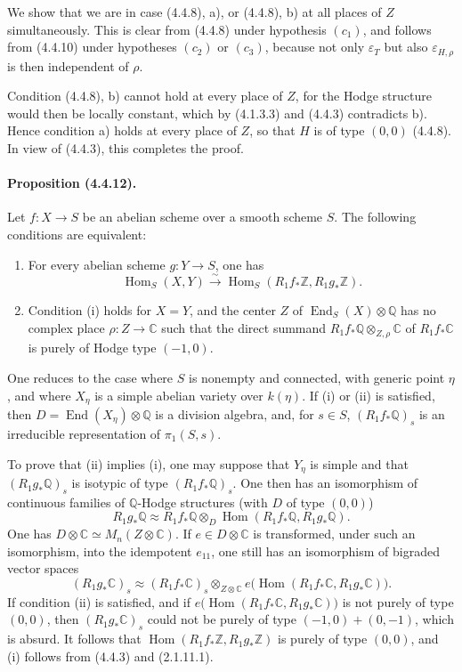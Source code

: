 \documentclass[10pt]{article}
\newcommand{\C}{\mathbb C}
\newcommand{\Q}{\mathbb Q}
\newcommand{\Z}{\mathbb Z}
\newcommand{\Hom}{\operatorname{Hom}}
\newcommand{\iso}{\xrightarrow{\sim}}
\providecommand{\End}{\operatorname{End}}
\begin{document}
We show that we are in case (4.4.8), a), or (4.4.8), b) at all places of $Z$ simultaneously. This is clear from (4.4.8) under hypothesis $(c_1)$, and follows from (4.4.10) under hypotheses $(c_2)$ or $(c_3)$, because not only $\varepsilon_T$ but also $\varepsilon_{H,\rho}$ is then independent of $\rho$.

Condition (4.4.8), b) cannot hold at every place of $Z$, for the Hodge structure would then be locally constant, which by (4.1.3.3) and (4.4.3) contradicts b). Hence condition a) holds at every place of $Z$, so that $H$ is of type $(0,0)$ (4.4.8). In view of (4.4.3), this completes the proof.

\paragraph{Proposition (4.4.12).} Let $f:X\to S$ be an abelian scheme over a smooth scheme $S$. The following conditions are equivalent:
\begin{enumerate}[label=(\roman*)]
\item For every abelian scheme $g:Y\to S$, one has
\[
\Hom_S(X,Y)\iso \Hom_S(R_1f_*\Z,R_1g_*\Z).
\]
\item Condition (i) holds for $X=Y$, and the center $Z$ of $\End_S(X)\otimes\Q$ has no complex place $\rho:Z\to\C$ such that the direct summand $R_1f_*\Q\otimes_{Z,\rho}\C$ of $R_1f_*\C$ is purely of Hodge type $(-1,0)$.
\end{enumerate}




One reduces to the case where $S$ is nonempty and connected, with generic point $\eta$, and where $X_\eta$ is a simple abelian variety over $k(\eta)$. If (i) or (ii) is satisfied, then $D=\End(X_\eta)\otimes\Q$ is a division algebra, and, for $s\in S$, $(R_1f_*\Q)_s$ is an irreducible representation of $\pi_1(S,s)$.

To prove that (ii) implies (i), one may suppose that $Y_\eta$ is simple and that $(R_1g_*\Q)_s$ is isotypic of type $(R_1f_*\Q)_s$. One then has an isomorphism of continuous families of $\Q$-Hodge structures (with $D$ of type $(0,0)$)
\[
R_1g_*\Q\approx R_1f_*\Q\otimes_D
\Hom(R_1f_*\Q,R_1g_*\Q).
\]
One has $D\otimes\C\simeq M_n(Z\otimes\C)$. If $e\in D\otimes\C$ is transformed, under such an isomorphism, into the idempotent $e_{11}$, one still has an isomorphism of bigraded vector spaces
\[
(R_1g_*\C)_s\approx (R_1f_*\C)_s\otimes_{Z\otimes\C}
e\bigl(\Hom(R_1f_*\C,R_1g_*\C)\bigr).
\]
If condition (ii) is satisfied, and if $e\bigl(\Hom(R_1f_*\C,R_1g_*\C)\bigr)$ is not purely of type $(0,0)$, then $(R_1g_*\C)_s$ could not be purely of type $(-1,0)+(0,-1)$, which is absurd. It follows that $\Hom(R_1f_*\Z,R_1g_*\Z)$ is purely of type $(0,0)$, and (i) follows from (4.4.3) and (2.1.11.1).
\end{document}
